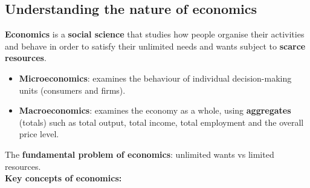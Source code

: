\documentclass[a4paper,12pt]{article}
\begin{document}
\subsection{Understanding the nature of economics}
\textbf{Economics} is a \textbf{social science} that studies how people organise their activities and behave in order to satisfy their unlimited needs and wants subject to \textbf{scarce resources}.
\begin{itemize}
  \item \textbf{Microeconomics}: examines the behaviour of individual decision-making units (consumers and firms).
  \item \textbf{Macroeconomics}: examines the economy as a whole, using \textbf{aggregates} (totals) such as total output, total income, total employment and the overall price level.
\end{itemize}
The \textbf{fundamental problem of economics}: unlimited wants vs limited resources.\\ 
\textbf{Key concepts of economics:}
\end{document}
